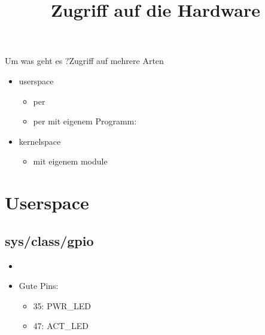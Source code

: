 \documentclass{beamer}
\begin{document}
\newcommand{\qemu}{{\em qemu}\xspace}
\newcommand{\busybox}{{\em busybox}\xspace}
\newcommand{\yocto}{{\em yocto}\xspace}
\title{Zugriff auf die Hardware}

\frame{\titlepage}

\begin{frame}{Um was geht es ?}{Zugriff auf mehrere Arten}
 \begin{itemize}
  \item userspace
  \begin{itemize}
   \item per 
   \item per  mit eigenem Programm: 
  \end{itemize}
  \item kernelspace
  \begin{itemize}
   \item mit eigenem module
  \end{itemize}
 \end{itemize}
\end{frame}

\section{Userspace}
\subsection{sys/class/gpio}
\begin{frame}{}
 \begin{itemize}
  \item {}
  \item Gute Pins:
   \begin{itemize}
    \item 35: PWR\_LED
    \item 47: ACT\_LED
   \end{itemize}
 \end{itemize}
\end{frame}
\end{document}
